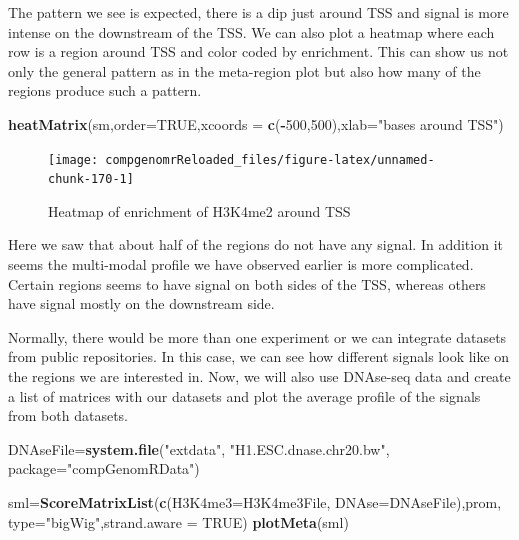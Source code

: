 \documentclass[12pt,]{krantz}
\newenvironment{Shaded}{\begin{snugshade}}{\end{snugshade}}
\newcommand{\DataTypeTok}[1]{\textcolor[rgb]{0.13,0.29,0.53}{#1}}
\newcommand{\DecValTok}[1]{\textcolor[rgb]{0.00,0.00,0.81}{#1}}
\newcommand{\KeywordTok}[1]{\textcolor[rgb]{0.13,0.29,0.53}{\textbf{#1}}}
\newcommand{\NormalTok}[1]{#1}
\newcommand{\OperatorTok}[1]{\textcolor[rgb]{0.81,0.36,0.00}{\textbf{#1}}}
\newcommand{\OtherTok}[1]{\textcolor[rgb]{0.56,0.35,0.01}{#1}}
\newcommand{\StringTok}[1]{\textcolor[rgb]{0.31,0.60,0.02}{#1}}
\begin{document}
The pattern we see is expected, there is a dip just around TSS and signal is more
intense on the downstream of the TSS. We can also plot a heatmap where each row is a
region around TSS and color coded by enrichment. This can show us not only the
general pattern as in the meta-region
plot but also how many of the regions produce such a pattern.

\begin{Shaded}
\begin{Highlighting}[]
\KeywordTok{heatMatrix}\NormalTok{(sm,}\DataTypeTok{order=}\OtherTok{TRUE}\NormalTok{,}\DataTypeTok{xcoords =} \KeywordTok{c}\NormalTok{(}\OperatorTok{-}\DecValTok{500}\NormalTok{,}\DecValTok{500}\NormalTok{),}\DataTypeTok{xlab=}\StringTok{"bases around TSS"}\NormalTok{)}
\end{Highlighting}
\end{Shaded}

\begin{figure}

{\centering \texttt{[image: compgenomrReloaded\_files/figure-latex/unnamed-chunk-170-1]} 

}

\caption{Heatmap of enrichment of H3K4me2 around TSS}\label{fig:unnamed-chunk-170}
\end{figure}

Here we saw that about half of the regions do not have any signal. In addition it seems the multi-modal profile we have observed earlier is more complicated. Certain regions seems to have signal on both sides of the TSS, whereas others have signal mostly on the downstream side.

Normally, there would be more than one experiment or we can integrate datasets from
public repositories. In this case, we can see how different signals look like on the regions we are interested in. Now, we will also use DNAse-seq data and create a list of matrices with our datasets and plot the average profile of the signals from both datasets.

\begin{Shaded}
\begin{Highlighting}[]
\NormalTok{DNAseFile=}\KeywordTok{system.file}\NormalTok{(}\StringTok{"extdata"}\NormalTok{,}
                      \StringTok{"H1.ESC.dnase.chr20.bw"}\NormalTok{,}
                      \DataTypeTok{package=}\StringTok{"compGenomRData"}\NormalTok{)}

\NormalTok{sml=}\KeywordTok{ScoreMatrixList}\NormalTok{(}\KeywordTok{c}\NormalTok{(}\DataTypeTok{H3K4me3=}\NormalTok{H3K4me3File,}
                      \DataTypeTok{DNAse=}\NormalTok{DNAseFile),prom,}
                      \DataTypeTok{type=}\StringTok{"bigWig"}\NormalTok{,}\DataTypeTok{strand.aware =} \OtherTok{TRUE}\NormalTok{)}
\KeywordTok{plotMeta}\NormalTok{(sml)}
\end{Highlighting}
\end{Shaded}
\end{document}
